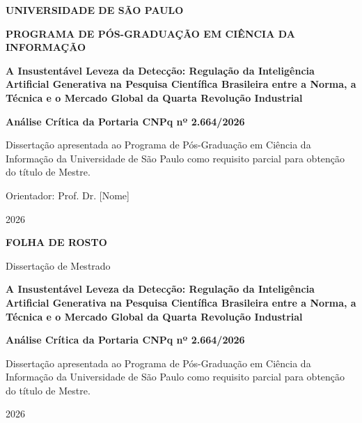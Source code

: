 \documentclass[
  12pt,
  a4paper,
  brazil,
  twoside
]{report}
\begin{document}
\begin{titlepage}
  \begin{center}
    \vspace*{2cm}
    {\large\bfseries UNIVERSIDADE DE S\~AO PAULO\par}
    {\large\bfseries PROGRAMA DE P\'OS-GRADUA\c{C}\~AO EM CI\^ENCIA DA INFORMA\c{C}\~AO\par}
    \vspace{4cm}
    {\LARGE\bfseries A Insustentável Leveza da Detecção: Regulação da
Inteligência Artificial Generativa na Pesquisa Científica Brasileira
entre a Norma, a Técnica e o Mercado Global da Quarta Revolução
Industrial\par}
    \vspace{0.5cm}
    {\large\bfseries Análise Crítica da Portaria CNPq nº 2.664/2026\par}
    \vspace{3cm}
    {\large Disserta\c{c}\~ao apresentada ao Programa de P\'os-Gradua\c{c}\~ao em
    Ci\^encia da Informa\c{c}\~ao da Universidade de S\~ao Paulo como requisito
    parcial para obten\c{c}\~ao do t\'itulo de Mestre.\par}
    \vspace{1cm}
    {\large Orientador: Prof. Dr. [Nome]\par}
    \vfill
    {\large 2026\par}
  \end{center}
\end{titlepage}

\newpage
\begin{center}
  \vspace*{4cm}
  {\Large\bfseries FOLHA DE ROSTO\par}
  \vspace{2cm}
  {\normalsize Disserta\c{c}\~ao de Mestrado\par}
  \vspace{0.5cm}
  {\normalsize \textbf{A Insustentável Leveza da Detecção: Regulação da
Inteligência Artificial Generativa na Pesquisa Científica Brasileira
entre a Norma, a Técnica e o Mercado Global da Quarta Revolução
Industrial}\par}
  \vspace{0.5cm}
  {\normalsize \textbf{Análise Crítica da Portaria CNPq nº
2.664/2026}\par}
  \vspace{1cm}
  \begin{flushright}
  \begin{minipage}{8cm}
  \small Disserta\c{c}\~ao apresentada ao Programa de P\'os-Gradua\c{c}\~ao em
  Ci\^encia da Informa\c{c}\~ao da Universidade de S\~ao Paulo como requisito
  parcial para obten\c{c}\~ao do t\'itulo de Mestre.
  \end{minipage}
  \end{flushright}
  \vfill
  {\large 2026\par}
\end{center}
\end{document}
